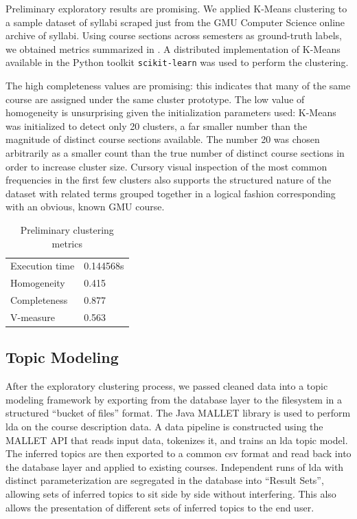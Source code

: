 
Preliminary exploratory results are promising.
We applied K-Means clustering to a sample dataset of syllabi scraped just from the GMU Computer Science online archive of syllabi.
Using course sections across semesters as ground-truth labels, we obtained metrics summarized in .
A distributed implementation of K-Means available in the Python toolkit \texttt{scikit-learn} was used to perform the clustering.


The high completeness values are promising: this indicates that many of the same course are assigned under the same cluster prototype.
The low value of homogeneity is unsurprising given the initialization parameters used: K-Means was initialized to detect only 20 clusters, a far smaller number than the magnitude of distinct course sections available.
The number 20 was chosen arbitrarily as a smaller count than the true number of distinct course sections in order to increase cluster size.
Cursory visual inspection of the most common frequencies in the first few clusters also supports the structured nature of the dataset with related terms grouped together in a logical fashion corresponding with an obvious, known GMU course.


\begin{table}[ht]
\centering
\begin{tabular}{ll}
\toprule
Execution time & 0.144568s \\
Homogeneity & 0.415 \\
Completeness & 0.877 \\
V-measure & 0.563 \\
\bottomrule
\end{tabular}
\caption{Preliminary clustering metrics\label{table:cluster-metrics}}
\end{table}


\subsection{Topic Modeling}
\label{sec:topic-modeling}

After the exploratory clustering process, we pass\-ed clean\-ed data into a topic modeling framework by exporting from the database layer to the filesystem in a structured ``bucket of files'' format.
The Java MALLET library is used to perform \ac{lda} on the course description data.
A data pipeline is constructed using the MALLET API that reads input data, tokenizes it, and trains an \ac{lda} topic model.
The inferred topics are then exported to a common \ac{csv} format and read back into the database layer and applied to existing courses.
Independent runs of \ac{lda} with distinct parameterization are segregated in the database into ``Result Sets'', allowing sets of inferred topics to sit side by side without interfering.
This also allows the presentation of different sets of inferred topics to the end user.


